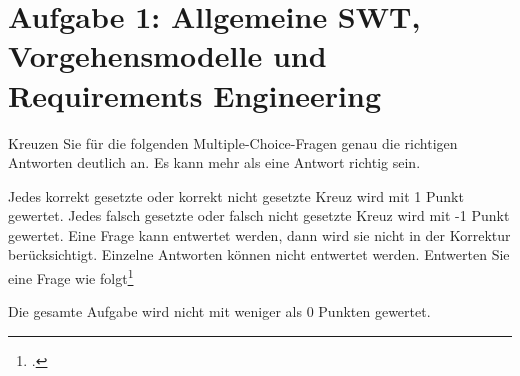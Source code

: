 \documentclass{bschlangaul-aufgabe}
\begin{document}

\section{Aufgabe 1: Allgemeine SWT, Vorgehensmodelle und Requirements
Engineering
}

Kreuzen Sie für die folgenden Multiple-Choice-Fragen genau die richtigen
Antworten deutlich an. Es kann mehr als eine Antwort richtig sein.

Jedes korrekt gesetzte oder korrekt nicht gesetzte Kreuz wird mit 1
Punkt gewertet. Jedes falsch gesetzte oder falsch nicht gesetzte Kreuz
wird mit -1 Punkt gewertet. Eine Frage kann entwertet werden, dann wird
sie nicht in der Korrektur berücksichtigt. Einzelne Antworten können
nicht entwertet werden. Entwerten Sie eine Frage wie
folgt\footcite{examen:46116:2014:09}

Die gesamte Aufgabe wird nicht mit weniger als 0 Punkten gewertet.
\end{document}
